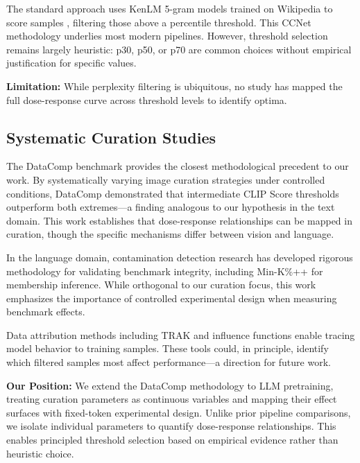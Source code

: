 The standard approach uses KenLM 5-gram models trained on Wikipedia to score samples \citep{wenzek2020ccnet}, filtering those above a percentile threshold. This CCNet methodology underlies most modern pipelines. However, threshold selection remains largely heuristic: p30, p50, or p70 are common choices without empirical justification for specific values.

\textbf{Limitation:} While perplexity filtering is ubiquitous, no study has mapped the full dose-response curve across threshold levels to identify optima.

\subsection{Systematic Curation Studies}

The DataComp benchmark \citep{gadre2023datacomp} provides the closest methodological precedent to our work. By systematically varying image curation strategies under controlled conditions, DataComp demonstrated that intermediate CLIP Score thresholds outperform both extremes---a finding analogous to our hypothesis in the text domain. This work establishes that dose-response relationships can be mapped in curation, though the specific mechanisms differ between vision and language.

In the language domain, contamination detection research \citep{shi2024minkpp,xu2024benchmarking} has developed rigorous methodology for validating benchmark integrity, including Min-K\%++ for membership inference. While orthogonal to our curation focus, this work emphasizes the importance of controlled experimental design when measuring benchmark effects.

Data attribution methods including TRAK \citep{park2023trak} and influence functions enable tracing model behavior to training samples. These tools could, in principle, identify which filtered samples most affect performance---a direction for future work.

\textbf{Our Position:} We extend the DataComp methodology to LLM pretraining, treating curation parameters as continuous variables and mapping their effect surfaces with fixed-token experimental design. Unlike prior pipeline comparisons, we isolate individual parameters to quantify dose-response relationships. This enables principled threshold selection based on empirical evidence rather than heuristic choice.
